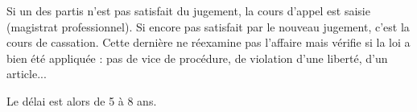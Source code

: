 	Si un des partis n’est pas satisfait du jugement, la cours d’appel est saisie (magistrat professionnel).
	Si encore pas satisfait par le nouveau jugement, c'est la cours de cassation.
	Cette dernière ne réexamine pas l'affaire mais vérifie si la loi a bien été appliquée : pas de vice de procédure, de violation d'une liberté, d'un article...
	
	Le délai est alors de 5 à 8 ans.